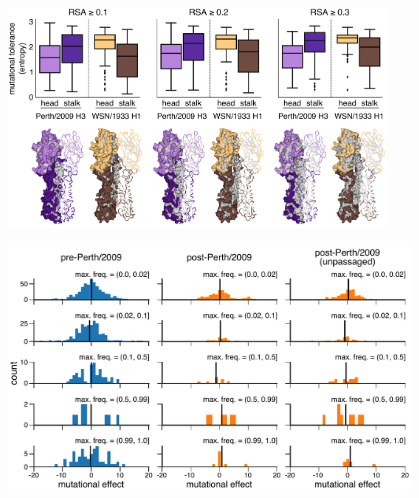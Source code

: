 \documentclass[9pt,twocolumn,twoside]{pnas-new}
\begin{document}
\begin{suppfigure}[H]
\centerline{\includegraphics[width=0.75\textwidth]{figs/supp_head_stalk_RSA/head_stalk_RSA.pdf}}
\caption{\label{suppfig:head_stalk_RSA}
{\bf Mutational tolerances of the head and stalk domains at various relative solvent accessibility cutoffs.}
The mutational tolerances of the head and stalk domains show less disparity for the Perth/2009 H3 HA compared to those for the WSN/1933 H1 HA.
We used relative solvent accessibility (RSA) cutoffs of $0.1$, $0.2$, and $0.3$ to define solvent-exposed residues and plotted the mutational tolerances (Shannon entropy of re-scaled preferences) of these residues in the head and stalk domains for the Perth/2009 H3 HA (purple) and the WSN/1933 H1 HA (brown).
Residues falling in between the two cysteines at sites 52 and 277 were defined as belonging to the head domain, while all other residues were defined as the stalk domain.
The HA structures color the residues that are defined as solvent exposed at a given RSA cutoff.
One monomer is shown in surface representation and another monomer shown in ribbon representation.
Residues in lighter shades of purple or brown are in the head domain, while residues in darker shades are in the stalk domain.
Note that the mutational tolerance values are not comparable between the two HAs.
}
\end{suppfigure}

\begin{suppfigure}[H]
\centerline{\includegraphics[width=0.8\textwidth]{figs/supp_muteffect_maxfreq_WSN/muteffect_maxfreq_WSN_supp.pdf}}
\caption{\label{suppfig:muteffect_maxfreq_WSN_supp}
{\bf The distribution of mutational effects measured in H1 HA among H3N2 mutations binned by the maximum frequency that they reach.}
This figure repeats the analysis of the H3N2 mutation frequencies in Figure~\ref{fig:muteffect_maxfreq}B, but uses the deep mutational scanning data for an H1 HA as measured in \cite{doud2016accurate}.
}
\end{suppfigure}
\end{document}
